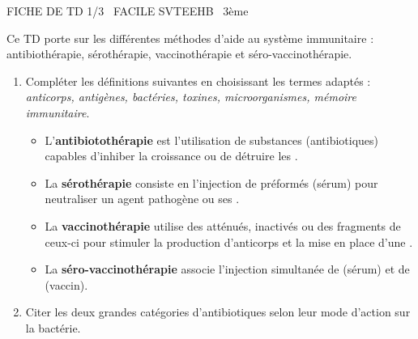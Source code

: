 \documentclass[11pt]{article}
\begin{document}
\begin{tcolorbox}[enhanced,colback=popink,colframe=popink,arc=10pt,boxrule=0pt,left=12pt,right=12pt,top=9pt,bottom=9pt]
{\color{white}\popxbold\small FICHE DE TD 1/3 \textbullet\ FACILE \hfill SVTEEHB \textbullet\ 3ème\par}
\end{tcolorbox}
\vspace{4pt}
Ce TD porte sur les différentes méthodes d'aide au système immunitaire : antibiothérapie, sérothérapie, vaccinothérapie et séro-vaccinothérapie.

\begin{exercice}
\begin{enumerate}
    \item Compléter les définitions suivantes en choisissant les termes adaptés : \textit{anticorps, antigènes, bactéries, toxines, microorganismes, mémoire immunitaire}.
    \begin{itemize}
        \item L'\textbf{antibiotothérapie} est l'utilisation de substances (antibiotiques) capables d'inhiber la croissance ou de détruire les \underline{\hspace{3cm}}.
        \item La \textbf{sérothérapie} consiste en l'injection de \underline{\hspace{3cm}} préformés (sérum) pour neutraliser un agent pathogène ou ses \underline{\hspace{3cm}}.
        \item La \textbf{vaccinothérapie} utilise des \underline{\hspace{3cm}} atténués, inactivés ou des fragments de ceux-ci pour stimuler la production d'anticorps et la mise en place d'une \underline{\hspace{3cm}}.
        \item La \textbf{séro-vaccinothérapie} associe l'injection simultanée de \underline{\hspace{3cm}} (sérum) et de \underline{\hspace{3cm}} (vaccin).
    \end{itemize}
    \item Citer les deux grandes catégories d'antibiotiques selon leur mode d'action sur la bactérie.
\end{enumerate}
\end{exercice}
\end{document}
